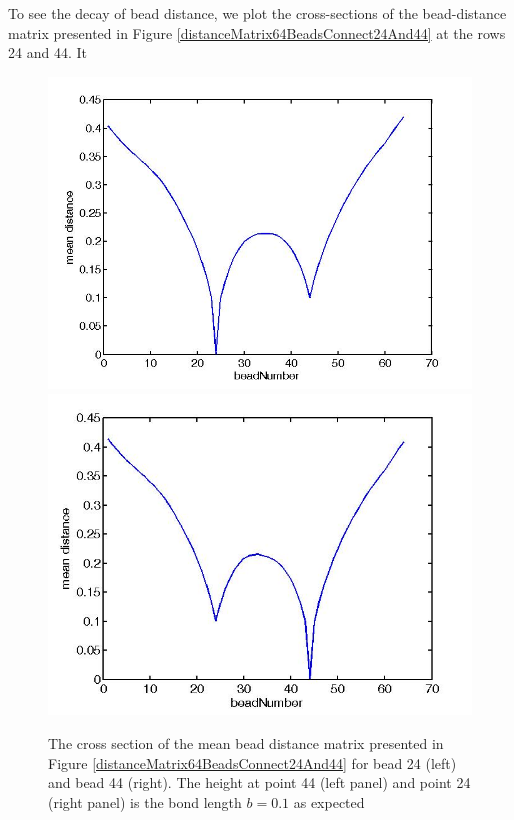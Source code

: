 \documentclass[12pt]{paper}
\begin{document}
To see the decay of bead distance, we plot the cross-sections of the bead-distance matrix presented in Figure \ref{distanceMatrix64BeadsConnect24And44} at the rows 24 and 44. It 
\begin{figure}[H]\label{crossectionAtRow24DistanceMatrix64BeadsConnect24And44}
\includegraphics[scale=0.3]{crossectionAtRow24DistanceMatrix64BeadsConnect24And44}
\includegraphics[scale=0.32]{crossectionAtRow44DistanceMatrix64BeadsConnect24And44}
\caption{The cross section of the mean bead distance matrix presented in Figure \ref{distanceMatrix64BeadsConnect24And44} for bead 24 (left) and bead 44 (right). The height at point 44 (left panel) and point 24 (right panel) is the bond length $b=0.1$ as expected}
\end{figure}
\end{document}
